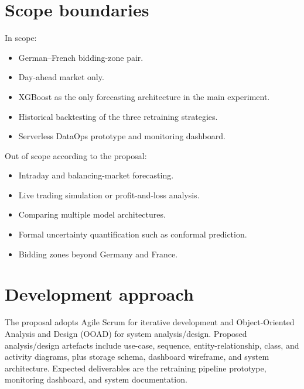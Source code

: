 \documentclass[11pt,a4paper]{article}
\begin{document}
\section{Scope boundaries}
In scope:
\begin{itemize}
  \item German--French bidding-zone pair.
  \item Day-ahead market only.
  \item XGBoost as the only forecasting architecture in the main experiment.
  \item Historical backtesting of the three retraining strategies.
  \item Serverless DataOps prototype and monitoring dashboard.
\end{itemize}
Out of scope according to the proposal:
\begin{itemize}
  \item Intraday and balancing-market forecasting.
  \item Live trading simulation or profit-and-loss analysis.
  \item Comparing multiple model architectures.
  \item Formal uncertainty quantification such as conformal prediction.
  \item Bidding zones beyond Germany and France.
\end{itemize}

\section{Development approach}
The proposal adopts Agile Scrum for iterative development and Object-Oriented Analysis and Design (OOAD) for system analysis/design. Proposed analysis/design artefacts include use-case, sequence, entity-relationship, class, and activity diagrams, plus storage schema, dashboard wireframe, and system architecture. Expected deliverables are the retraining pipeline prototype, monitoring dashboard, and system documentation.
\end{document}

